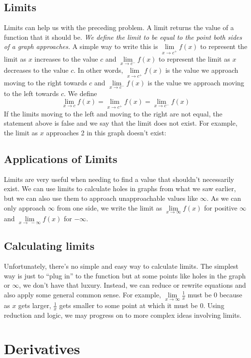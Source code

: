 \documentclass[]{article}
\begin{document}
\subsection{Limits} Limits can help us with the preceding problem. A limit returns the value of a function that it should be. \textit{We define the limit to be equal to the point both sides of a graph approaches.} A simple way to write this is $\lim\limits_{x\to c^{+}}f(x)$ to represent the limit as $x$ increases to the value $c$ and $\lim\limits_{x\to c^{-}}f(x)$ to represent the limit as $x$ decreases to the value $c$. In other words, $\lim\limits_{x\to c^{+}}f(x)$ is the value we approach moving to the right towards $c$ and $\lim\limits_{x\to c^{-}}f(x)$ is the value we approach moving to the left towards $c$. We define $$\lim\limits_{x\to c} f(x)= \lim\limits_{x\to c^{+}} f(x)=\lim\limits_{x\to c^{-}}f(x)$$ If the limits moving to the left and moving to the right are not equal, the statement above is false and we say that the limit does not exist. For example, the limit as $x$ approaches 2 in this graph doesn't exist:
\begin{center}
\end{center}
\subsection{Applications of Limits} Limits are very useful when needing to find a value that shouldn't necessarily exist. We can use limits to calculate holes in graphs from what we saw earlier, but we can also use them to approach unapproachable values like $\infty$. As we can only approach $\infty$ from one side, we write the limit as $\lim\limits_{x\to\infty} f(x)$ for positive $\infty$ and $\lim\limits_{x\to\ -\infty} f(x)$ for $-\infty$.
\subsection{Calculating limits} Unfortunately, there's no simple and easy way to calculate limits. The simplest way is just to ``plug in'' to the function but at some points like holes in the graph or $\infty$, we don't have that luxury. Instead, we can reduce or rewrite equations and also apply some general common sense. For example, $\lim\limits_{x\to\infty} \frac{1}{x}$ must be 0 because as $x$ gets larger, $\frac{1}{x}$ gets smaller to some point at which it must be 0. Using reduction and logic, we may progress on to more complex ideas involving limits.
\pagebreak
\section{Derivatives}
\end{document}
